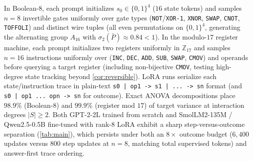 In Boolean-8, each prompt initializes $s_0 \in \{0,1\}^4$ ($16$ state tokens) and samples $n = 8$ invertible gates uniformly over gate types (\texttt{NOT}/\texttt{XOR-1}, \texttt{XNOR}, \texttt{SWAP}, \texttt{CNOT}, \texttt{TOFFOLI}) and distinct wire tuples (all even permutations on $\{0,1\}^4$, generating the alternating group $A_{16}$ with $\sigma_2(\bar P) \approx 0.84 < 1$). In the modulo-$17$ register machine, each prompt initializes two registers uniformly in $\mathbb Z_{17}$ and samples $n = 16$ instructions uniformly over (\texttt{INC}, \texttt{DEC}, \texttt{ADD}, \texttt{SUB}, \texttt{SWAP}, \texttt{CMOV}) and operands before querying a target register (including non-bijective \texttt{CMOV}, testing high-degree state tracking beyond \cref{cor:reversible}). LoRA runs serialize each state/instruction trace in plain-text \texttt{s0 | op1 -> s1 | ... -> sn} format (and \texttt{s0 | op1 ... opn -> sn} for outcome). Exact ANOVA decompositions place $98.9\%$ (Boolean-8) and $99.9\%$ (register mod $17$) of target variance at interaction degrees $|S| \ge 2$. Both GPT-2-2L trained from scratch and SmolLM2-135M / Qwen2.5-0.5B fine-tuned with rank-$8$ LoRA exhibit a sharp step-versus-outcome separation (\cref{tab:main}), which persists under both an $8\times$ outcome budget ($6{,}400$ updates versus $800$ step updates at $n=8$, matching total supervised tokens) and answer-first trace ordering.

\begin{table}[!htbp]
\caption{\textbf{Held-out accuracy (\%) across tasks and model tiers} (mean and min--max range over seeds). Counting rows report seeds solved ($\ge 99.9\%$ exact) at the stated update budget; at $32$k updates the $p=1/2$ outcome runs reach $48$--$99\%$ with $0/10$ solved. First-occurrence counts use the $\ge 90\%$ criterion of \cref{tab:controls}.}
\label{tab:main}
\centering\footnotesize
{}
\end{table}


